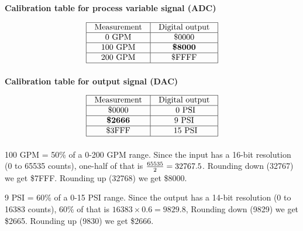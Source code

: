 
\noindent
{\bf Calibration table for process variable signal (ADC)}


$$\vbox{\offinterlineskip
\halign{\strut
\vrule \quad\hfil # \ \hfil & 
\vrule \quad\hfil # \ \hfil \vrule \cr
\noalign{\hrule}
%
Measurement & Digital output \cr
%
\noalign{\hrule}
%
0 GPM & \$0000 \cr
%
\noalign{\hrule}
%
100 GPM & {\bf \$8000} \cr
%
\noalign{\hrule}
%
200 GPM & \$FFFF \cr
%
\noalign{\hrule}
} %
}$$ %

\vskip 10pt

\noindent
{\bf Calibration table for output signal (DAC)}


$$\vbox{\offinterlineskip
\halign{\strut
\vrule \quad\hfil # \ \hfil & 
\vrule \quad\hfil # \ \hfil \vrule \cr
\noalign{\hrule}
%
Measurement & Digital output \cr
%
\noalign{\hrule}
%
\$0000 & 0 PSI\cr
%
\noalign{\hrule}
%
{\bf \$2666} & 9 PSI \cr
%
\noalign{\hrule}
%
\$3FFF & 15 PSI\cr
%
\noalign{\hrule}
} %
}$$ %








100 GPM = 50\% of a 0-200 GPM range.  Since the input has a 16-bit resolution (0 to 65535 counts), one-half of that is ${65535 \over 2} = 32767.5$.  Rounding down (32767) we get \$7FFF.  Rounding up (32768) we get \$8000.

\vskip 10pt

9 PSI = 60\% of a 0-15 PSI range.  Since the output has a 14-bit resolution (0 to 16383 counts), 60\% of that is $16383 \times 0.6 = 9829.8$,  Rounding down (9829) we get \$2665.  Rounding up (9830) we get \$2666.




